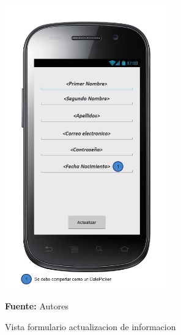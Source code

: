\begin{figure}[!htb]
  \begin{center}
\includegraphics[width=7cm]{./imagenes/UI/Usuarios/formulario_actualizacion_de_informacion.png}
    \caption{Vista formulario actualizacion de informacion}
    \label{fig:Vista_formulario_actualizacion_de_informacion}
    \textbf{Fuente:}  Autores
  \end{center}
\end{figure}
